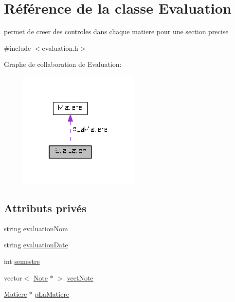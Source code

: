 \hypertarget{class_evaluation}{\section{Référence de la classe Evaluation}
\label{class_evaluation}
}


permet de creer des controles dans chaque matiere pour une section precise  




{\ttfamily \#include $<$evaluation.\+h$>$}



Graphe de collaboration de Evaluation\+:\nopagebreak
\begin{figure}[H]
\begin{center}
\leavevmode
\includegraphics[width=170pt]{class_evaluation__coll__graph}
\end{center}
\end{figure}
\subsection*{Attributs privés}
\begin{DoxyCompactItemize}
\item 
string \hyperlink{class_evaluation_aaa4db227004bf8c359d863f6e1dbbefd}{evaluation\+Nom}
\item 
string \hyperlink{class_evaluation_ab9db02e7354335d10cf64c0b6d1e730f}{evaluation\+Date}
\item 
int \hyperlink{class_evaluation_ae000ec143562ed56975018bf82b13b5c}{semestre}
\item 
vector$<$ \hyperlink{class_note}{Note} $\ast$ $>$ \hyperlink{class_evaluation_ab235409526456cca10772832104f85f1}{vect\+Note}
\item 
\hyperlink{class_matiere}{Matiere} $\ast$ \hyperlink{class_evaluation_ad5f4d301c80076389e2ea31dfd7f09b1}{p\+La\+Matiere}
\end{DoxyCompactItemize}


